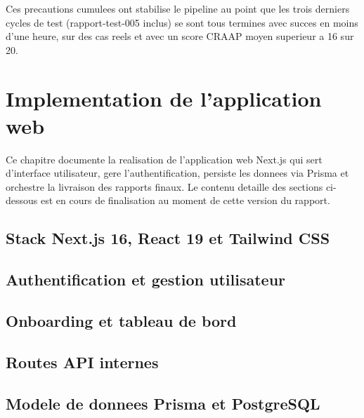 \documentclass[12pt,a4paper,openany]{report}
\begin{document}
Ces precautions cumulees ont stabilise le pipeline au point que les trois derniers cycles de test (rapport-test-005 inclus) se sont tous termines avec succes en moins d'une heure, sur des cas reels et avec un score CRAAP moyen superieur a 16 sur 20.

\chapter{Implementation de l'application web}
\label{chap:application-web}

\begin{noteBox}[title=Note de l'editeur du rapport]
Ce chapitre documente la realisation de l'application web Next.js qui sert d'interface utilisateur, gere l'authentification, persiste les donnees via Prisma et orchestre la livraison des rapports finaux. Le contenu detaille des sections ci-dessous est en cours de finalisation au moment de cette version du rapport.
\end{noteBox}

\section{Stack Next.js 16, React 19 et Tailwind CSS}
\label{sec:karamo-stack}


\section{Authentification et gestion utilisateur}
\label{sec:karamo-auth}


\section{Onboarding et tableau de bord}
\label{sec:karamo-dashboard}


\section{Routes API internes}
\label{sec:karamo-api}


\section{Modele de donnees Prisma et PostgreSQL}
\label{sec:karamo-prisma}
\end{document}
